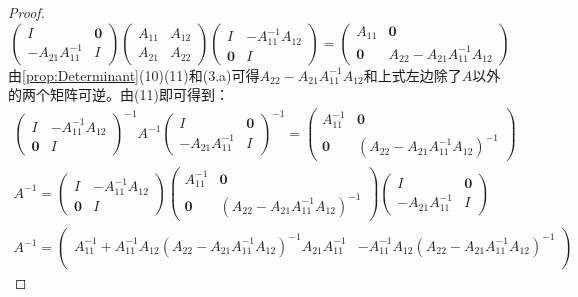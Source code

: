 \begin{proof}
	\begin{equation*}
		\begin{pmatrix}
			I & \mathbf{0} \\
			-A_{21}A_{11}^{-1} & I
		\end{pmatrix}
		\begin{pmatrix}
			A_{11} & A_{12} \\
			A_{21} & A_{22}
		\end{pmatrix}
		\begin{pmatrix}
			I & -A_{11}^{-1}A_{12} \\
			\mathbf{0} & I
		\end{pmatrix}=
		\begin{pmatrix}
			A_{11} & \mathbf{0} \\
			\mathbf{0} & A_{22}-A_{21}A_{11}^{-1}A_{12}
		\end{pmatrix}
	\end{equation*}
	由\cref{prop:Determinant}(10)(11)和(3.a)可得$A_{22}-A_{21}A_{11}^{-1}A_{12}$和上式左边除了$A$以外的两个矩阵可逆。由(11)即可得到：
	\begin{gather*}
		\begin{pmatrix}
			I & -A_{11}^{-1}A_{12} \\
			\mathbf{0} & I
		\end{pmatrix}^{-1}A^{-1}
		\begin{pmatrix}
			I & \mathbf{0} \\
			-A_{21}A_{11}^{-1} & I
		\end{pmatrix}^{-1}=
		\begin{pmatrix}
			A_{11}^{-1} & \mathbf{0} \\
			\mathbf{0} & (A_{22}-A_{21}A_{11}^{-1}A_{12})^{-1}
		\end{pmatrix} \\
		A^{-1}=
		\begin{pmatrix}
			I & -A_{11}^{-1}A_{12} \\
			\mathbf{0} & I
		\end{pmatrix}
		\begin{pmatrix}
			A_{11}^{-1} & \mathbf{0} \\
			\mathbf{0} & (A_{22}-A_{21}A_{11}^{-1}A_{12})^{-1}
		\end{pmatrix}
		\begin{pmatrix}
			I & \mathbf{0} \\
			-A_{21}A_{11}^{-1} & I
		\end{pmatrix} \\
		A^{-1}=
		\begin{pmatrix}
			A_{11}^{-1}+A_{11}^{-1}A_{12}(A_{22}-A_{21}A_{11}^{-1}A_{12})^{-1}A_{21}A_{11}^{-1} & -A_{11}^{-1}A_{12}(A_{22}-A_{21}A_{11}^{-1}A_{12})^{-1} \\

\end{pmatrix}
\end{gather*}
\end{proof}
